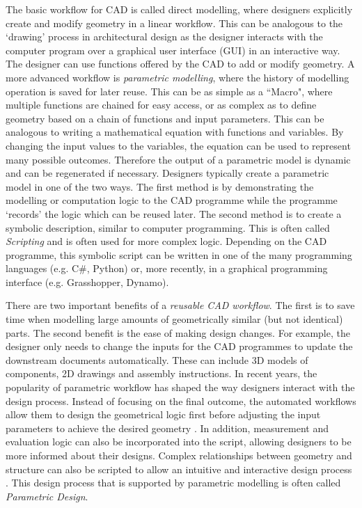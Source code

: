 The basic workflow for CAD is called direct modelling, where designers explicitly create and modify geometry in a linear workflow. This can be analogous to the ‘drawing’ process in architectural design as the designer interacts with the computer program over a graphical user interface (GUI) in an interactive way. The designer can use functions offered by the CAD to add or modify geometry. A more advanced workflow is \textit{parametric modelling}, where the history of modelling operation is saved for later reuse. This can be as simple as a ``Macro", where multiple functions are chained for easy access, or as complex as to define geometry based on a chain of functions and input parameters. This can be analogous to writing a mathematical equation with functions and variables. By changing the input values to the variables, the equation can be used to represent many possible outcomes. Therefore the output of a parametric model is dynamic and can be regenerated if necessary. Designers typically create a parametric model in one of the two ways. The first method is by demonstrating the modelling or computation logic to the CAD programme while the programme ‘records’ the logic which can be reused later. The second method is to create a symbolic description, similar to computer programming. This is often called \textit{Scripting} and is often used for more complex logic. Depending on the CAD programme, this symbolic script can be written in one of the many programming languages (e.g. C$\#$, Python) or, more recently, in a graphical programming interface (e.g. Grasshopper, Dynamo). 

There are two important benefits of a \textit{reusable CAD workflow}. The first is to save time when modelling large amounts of geometrically similar (but not identical) parts. The second benefit is the ease of making design changes. For example, the designer only needs to change the inputs for the CAD programmes to update the downstream documents automatically. These can include 3D models of components, 2D drawings and assembly instructions. In recent years, the popularity of parametric workflow has shaped the way designers interact with the design process. Instead of focusing on the final outcome, the automated workflows allow them to design the geometrical logic first before adjusting the input parameters to achieve the desired geometry \parencite{jabiParametricDesignArchitecture2013}. In addition, measurement and evaluation logic can also be incorporated into the script, allowing designers to be more informed about their designs. Complex relationships between geometry and structure can also be scripted to allow an intuitive and interactive design process \parencite{pottmannArchitecturalGeometry2007, woodburyElementsParametricDesign2010}. This design process that is supported by parametric modelling is often called \textit{Parametric Design}.

